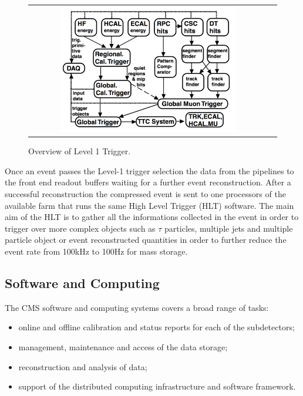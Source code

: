 \begin{figure}[tbh!]
	\centering
	\begin{tabular}{cc}
		\includegraphics[width=0.75\textwidth]{detector/pics/trigger_lvl1.pdf}
	\end{tabular}
	\caption{Overview of Level 1 Trigger.}
	\label{fig:trigger_lvl1}
\end{figure}

Once an event passes the Level-1 trigger selection the data from the pipelines to the front end readout buffers waiting for a further event reconstruction. After a successful reconstruction the compressed event is sent to one processors of the available farm that runs the same High Level Trigger (HLT) software. The main aim of the HLT is to gather all the informations collected in the event in order to trigger over more complex objects such as $\tau$ particles, multiple jets and multiple particle object or event reconstructed quantities in order to further reduce the event rate from 100kHz to 100Hz for mass storage.

\subsection{Software and Computing}

The CMS software and computing systems covers a broad range of tasks:

\begin{itemize}
	\item online and offline calibration and status reports for each of the subdetectors;
	\item management, maintenance and access of the data storage;
	\item reconstruction and analysis of data;
	\item support of the distributed computing infrastructure and software framework.
\end{itemize}

